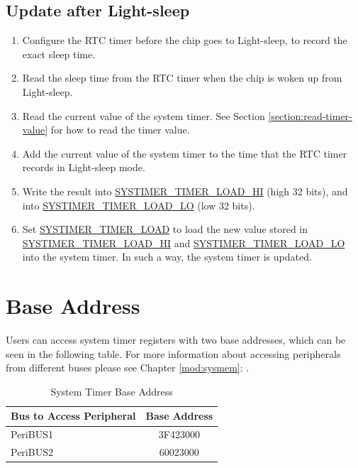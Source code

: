 \documentclass[main\_\_EN.tex]{subfiles}
\begin{document}
\subsection{Update after Light-sleep}

\begin{enumerate}

    \item Configure the RTC timer before the chip goes to Light-sleep, to record the exact sleep time. 
    \item Read the sleep time from the RTC timer when the chip is woken up from Light-sleep. 
    \item Read the current value of the system timer. See Section \ref{section:read-timer-value} for how to read the timer value.
    \item Add the current value of the system timer to the time that the RTC timer records in Light-sleep mode.
    \item Write the result into \hyperref[fielddesc:SYSTIMERTIMERLOADHI]{SYSTIMER\_TIMER\_LOAD\_HI} (high 32 bits), and into \hyperref[fielddesc:SYSTIMERTIMERLOADLO]{SYSTIMER\_TIMER\_LOAD\_LO} (low 32 bits).
    \item Set \hyperref[fielddesc:SYSTIMERTIMERLOAD]{SYSTIMER\_TIMER\_LOAD} to load the new value stored in \hyperref[fielddesc:SYSTIMERTIMERLOADHI]{SYSTIMER\_TIMER\_LOAD\_HI} and \hyperref[fielddesc:SYSTIMERTIMERLOADLO]{SYSTIMER\_TIMER\_LOAD\_LO} into the system timer. In such a way, the system timer is updated.
\end{enumerate}




\section{Base Address}\label{SYSTIMER_BASE_ADDRESS}
Users can access system timer registers with two base addresses, which can be seen in the following table. For more information about accessing peripherals from different buses please see Chapter \ref{mod:sysmem}: \textit{}.

\begin{longtable}[c]{ | l | c | }
\caption{System Timer Base Address}\label{table:SYSTIMER-Base-Addresses} \\
\hline
\rowcolor{lightgray}
Bus to Access Peripheral & Base Address \\
    \hline
PeriBUS1 & \hexprefix{}3F423000 \\
    \hline
PeriBUS2 & \hexprefix{}60023000 \\
    \hline
\end{longtable}
\end{document}
